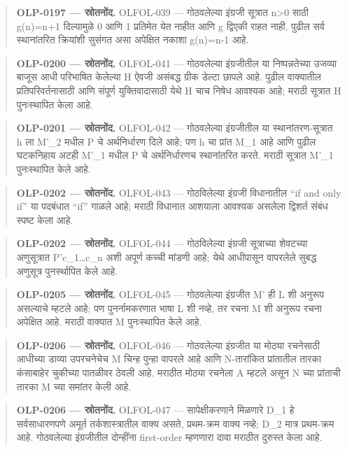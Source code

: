 \begin{quote}\small\textbf{OLP-0197 — स्रोतनोंद.} OLFOL-039 — गोठवलेल्या इंग्रजी सूत्रात n>0 साठी g(n)=n+1 दिल्यामुळे 0 आणि 1 प्रतिमेत येत नाहीत आणि g द्विएकी राहत नाही. पुढील सर्व स्थानांतरित क्रियांशी सुसंगत असा अपेक्षित नकाशा g(n)=n-1 आहे.\end{quote}
\begin{quote}\small\textbf{OLP-0200 — स्रोतनोंद.} OLFOL-041 — गोठवलेल्या इंग्रजीतील या निष्पन्नतेच्या उजव्या बाजूस आधी परिभाषित केलेल्या H ऐवजी असंबद्ध ग्रीक डेल्टा छापले आहे. पुढील वाक्यातील प्रतिपरिवर्तनासाठी आणि संपूर्ण युक्तिवादासाठी येथे H चाच निषेध आवश्यक आहे; मराठी सूत्रात H पुनःस्थापित केला आहे.\end{quote}
\begin{quote}\small\textbf{OLP-0201 — स्रोतनोंद.} OLFOL-042 — गोठवलेल्या इंग्रजीतील या स्थानांतरण-सूत्रात h ला M'\_2 मधील P चे अर्थनिर्धारण दिले आहे; पण h चा प्रांत M\_1 आहे आणि पुढील घटकनिहाय अटही M'\_1 मधील P चे अर्थनिर्धारणच स्थानांतरित करते. मराठी सूत्रात M'\_1 पुनःस्थापित केले आहे.\end{quote}
\begin{quote}\small\textbf{OLP-0202 — स्रोतनोंद.} OLFOL-043 — गोठविलेल्या इंग्रजी विधानातील “if and only if” या पदबंधात “if” गाळले आहे; मराठी विधानात आशयाला आवश्यक असलेला द्विशर्त संबंध स्पष्ट केला आहे.\end{quote}
\begin{quote}\small\textbf{OLP-0202 — स्रोतनोंद.} OLFOL-044 — गोठविलेल्या इंग्रजी सूत्राच्या शेवटच्या अणुसूत्रात P'c\_1…c\_n अशी अपूर्ण कच्ची मांडणी आहे; येथे आधीपासून वापरलेले सुबद्ध अणुसूत्र पुनर्स्थापित केले आहे.\end{quote}
\begin{quote}\small\textbf{OLP-0205 — स्रोतनोंद.} OLFOL-045 — गोठवलेल्या इंग्रजीत M' ही L शी अनुरूप असल्याचे म्हटले आहे; पण पुनर्नामकरणात भाषा L शी नव्हे, तर रचना M शी अनुरूप रचना अपेक्षित आहे. मराठी वाक्यात M पुनःस्थापित केले आहे.\end{quote}
\begin{quote}\small\textbf{OLP-0206 — स्रोतनोंद.} OLFOL-046 — गोठवलेल्या इंग्रजीत या मोठ्या रचनेसाठी आधीच्या डाव्या उपरचनेचेच M चिन्ह पुन्हा वापरले आहे आणि N-तारांकित प्रांतातील तारका कंसाबाहेर चुकीच्या पातळीवर ठेवली आहे. मराठीत मोठ्या रचनेला A म्हटले असून N च्या प्रांताची तारका M च्या समांतर केली आहे.\end{quote}
\begin{quote}\small\textbf{OLP-0206 — स्रोतनोंद.} OLFOL-047 — सापेक्षीकरणाने मिळणारे D\_1 हे सर्वसाधारणपणे अमूर्त तर्कशास्त्रातील वाक्य असते, प्रथम-क्रम वाक्य नव्हे; D\_2 मात्र प्रथम-क्रम आहे. गोठवलेल्या इंग्रजीतील दोन्हींना first-order म्हणणारा दावा मराठीत दुरुस्त केला आहे.\end{quote}
